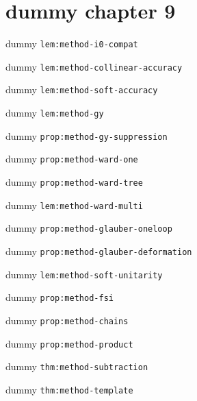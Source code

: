 \chapter{dummy chapter 9}
\begin{lemma}\label{lem:method-i0-compat}dummy \texttt{lem:method-i0-compat}\end{lemma}
\begin{lemma}\label{lem:method-collinear-accuracy}dummy \texttt{lem:method-collinear-accuracy}\end{lemma}
\begin{lemma}\label{lem:method-soft-accuracy}dummy \texttt{lem:method-soft-accuracy}\end{lemma}
\begin{lemma}\label{lem:method-gy}dummy \texttt{lem:method-gy}\end{lemma}
\begin{proposition}\label{prop:method-gy-suppression}dummy \texttt{prop:method-gy-suppression}\end{proposition}
\begin{proposition}\label{prop:method-ward-one}dummy \texttt{prop:method-ward-one}\end{proposition}
\begin{proposition}\label{prop:method-ward-tree}dummy \texttt{prop:method-ward-tree}\end{proposition}
\begin{lemma}\label{lem:method-ward-multi}dummy \texttt{lem:method-ward-multi}\end{lemma}
\begin{proposition}\label{prop:method-glauber-oneloop}dummy \texttt{prop:method-glauber-oneloop}\end{proposition}
\begin{proposition}\label{prop:method-glauber-deformation}dummy \texttt{prop:method-glauber-deformation}\end{proposition}
\begin{lemma}\label{lem:method-soft-unitarity}dummy \texttt{lem:method-soft-unitarity}\end{lemma}
\begin{proposition}\label{prop:method-fsi}dummy \texttt{prop:method-fsi}\end{proposition}
\begin{proposition}\label{prop:method-chains}dummy \texttt{prop:method-chains}\end{proposition}
\begin{proposition}\label{prop:method-product}dummy \texttt{prop:method-product}\end{proposition}
\begin{theorem}\label{thm:method-subtraction}dummy \texttt{thm:method-subtraction}\end{theorem}
\begin{theorem}\label{thm:method-template}dummy \texttt{thm:method-template}\end{theorem}
\begin{table}[h]\centering\caption{dummy tab:method-hypotheses}\label{tab:method-hypotheses}\end{table}
\appendix
\setcounter{chapter}{14}\addtocounter{chapter}{-1}
